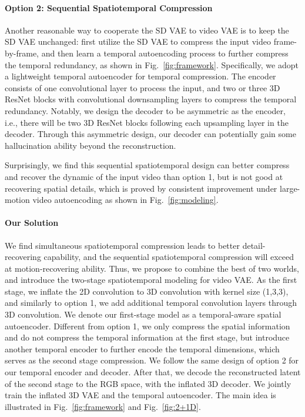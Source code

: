 \paragraph{Option 2: Sequential Spatiotemporal Compression}
Another reasonable way to cooperate the SD VAE to video VAE is to keep the SD VAE unchanged: first utilize the SD VAE to compress the input video frame-by-frame, and then learn a temporal autoencoding process to further compress the temporal redundancy, as shown in Fig.~\ref{fig:framework}. Specifically, we adopt a lightweight temporal autoencoder for temporal compression. The encoder consists of one convolutional layer to process the input, and two or three 3D ResNet blocks with convolutional downsampling layers to compress the temporal redundancy. Notably, we design the decoder to be asymmetric as the encoder, i.e., there will be two 3D ResNet blocks following each upsampling layer in the decoder. Through this asymmetric design, our decoder can potentially gain some hallucination ability beyond the reconstruction. 

Surprisingly, we find this sequential spatiotemporal design can better compress and recover the dynamic of the input video than option 1, but is not good at recovering spatial details, which is proved by consistent improvement under large-motion video autoencoding as shown in Fig.~\ref{fig:modeling}. 

\paragraph{Our Solution} We find simultaneous spatiotemporal compression leads to better detail-recovering capability, and the sequential spatiotemporal compression will exceed at motion-recovering ability. Thus, we propose to combine the best of two worlds, and introduce the two-stage spatiotemporal modeling for video VAE. As the first stage, we inflate the 2D convolution to 3D convolution with kernel size (1,3,3), and similarly to option 1, we add additional temporal convolution layers through 3D convolution. We denote our first-stage model as a temporal-aware spatial autoencoder. Different from option 1, we only compress the spatial information and do not compress the temporal information at the first stage, but introduce another temporal encoder to further encode the temporal dimensions, which serves as the second stage compression. We follow the same design of option 2 for our temporal encoder and decoder. After that, we decode the reconstructed latent of the second stage to the RGB space, with the inflated 3D decoder. We jointly train the inflated 3D VAE and the temporal autoencoder. The main idea is illustrated in Fig.~\ref{fig:framework} and Fig.~\ref{fig:2+1D}. 

